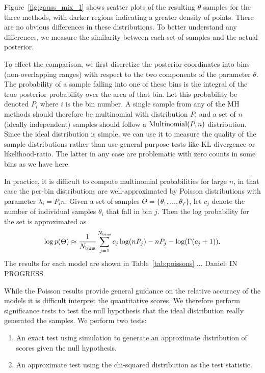 \documentclass{article}
\begin{document}
Figure~\ref{fig:gauss_mix_1} shows scatter plots of the resulting $\theta$
samples for the three methods, with darker regions indicating a greater density
of points. There are no obvious differences in these distributions. To better
understand any differences, we measure the similarity between each set of
samples and the actual posterior. 

To effect the comparison, we first discretize the posterior coordinates into
bins (non-overlapping ranges) with respect to the two components of the
parameter $\theta$.  The probability of a sample falling into one of these bins
is the integral of the true posterior probability over the area of that bin. Let
this probability be denoted $P_i$ where $i$ is the bin number. A single sample
from any of the MH methods should therefore be multinomial with distribution
$P$, and a set of $n$ (ideally independent) samples should follow a ${\rm
Multinomial}(P,n)$ distribution.  Since the ideal distribution is simple, we can
use it to measure the quality of the sample distributions rather than use
general purpose tests like KL-divergence or likelihood-ratio.  The latter in any
case are problematic with zero counts in some bins as we have here.

In practice, it is difficult to compute multinomial probabilities for large $n$,
in that case the per-bin distributions are well-approximated by Poisson
distributions with parameter $\lambda_i=P_i n$. Given a set of samples $\Theta =
\{\theta_1,\ldots,\theta_T\}$, let $c_j$ denote the number of individual samples
$\theta_i$ that fall in bin $j$. Then the log probability for the set is
approximated as
\begin{equation}\label{eq:log_prob_poissons}
    \log p(\Theta) \approx \frac{1}{N_{\rm bins}} \sum_{j=1}^{N_{\rm bins}} c_j \log (n P_j) - n P_j - \log(\Gamma(c_j+1)).
\end{equation}
The results for each model are shown in Table~\ref{tab:poissons} ...
{\color{blue} Daniel: IN PROGRESS}

While the Poisson results provide general guidance on the relative accuracy of
the models it is difficult interpret the quantitative scores. We therefore
perform significance tests to test the null hypothesis that the ideal
distribution really generated the samples.  We perform two tests:

\begin{enumerate}
    \item An exact test using simulation to generate an approximate distribution
    of scores given the null hypothesis.

    \item An approximate test using the chi-squared distribution as the test
    statistic. 
\end{enumerate}
\end{document}
